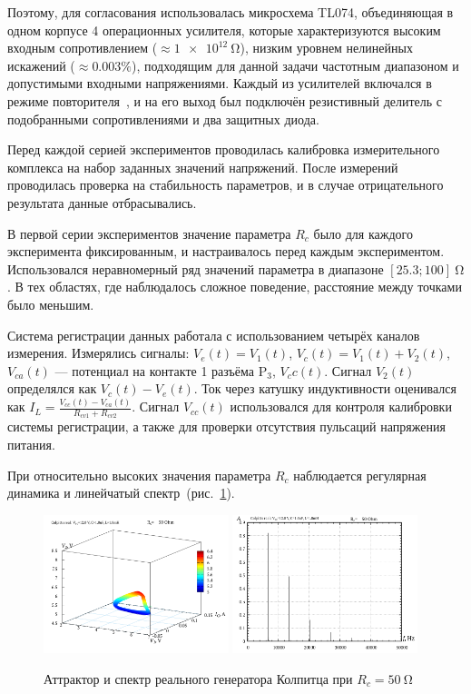 Поэтому, для согласования использовалась микросхема TL074,
объединяющая в одном корпусе 4 операционных усилителя,
которые характеризуются высоким входным сопротивлением ($\approx \SI{1e12}{\ohm}$),
низким уровнем нелинейных искажений ($\approx 0.003\%$),
подходящим для данной задачи частотным диапазоном
и допустимыми входными напряжениями.
Каждый из усилителей включался в режиме повторителя~\cite{horowitz},
и на его выход был подключён резистивный делитель
с подобранными сопротивлениями и два защитных диода.

Перед каждой серией экспериментов проводилась калибровка
измерительного комплекса на набор заданных значений напряжений.
После измерений проводилась проверка на стабильность
параметров, и в случае отрицательного результата
данные отбрасывались.

В первой серии экспериментов значение параметра
$R_c$ было для каждого эксперимента фиксированным,
и настраивалось перед каждым экспериментом.
Использовался неравномерный ряд значений параметра в диапазоне $[ 25.3 ; 100]\SI{}{\ohm} $.
В тех областях, где наблюдалось сложное поведение, расстояние между точками было меньшим.

Система регистрации данных работала с использованием четырёх
каналов измерения. Измерялись сигналы:
$V_e(t) = V_1(t)$,
$V_c(t) = V_1(t) + V_2(t)$,
$V_{ca}(t)$ --- потенциал на контакте 1 разъёма $\mathrm{P}_3$,
$V_cc(t)$.
Сигнал $V_2(t)$ определялся как $V_c(t) - V_e(t)$.
Ток через катушку индуктивности оценивался как
$I_L = \frac{V_{cc}(t) - V_{ca}(t)}{R_{cv1}+R_{cv2}}$.
Сигнал $V_{cc}(t)$ использовался для контроля калибровки
системы регистрации, а также для проверки отсутствия пульсаций напряжения питания.



При относительно высоких значения параметра $R_c$
наблюдается регулярная динамика и линейчатый спектр~(рис.~\ref{atu:f:colp_r_attr_f_50}).

\begin{figure}[htb!]
  \centerline{
    \includegraphics[width=0.48\textwidth]{p/r/v1iv2_050000.png}
    \hfill
    \includegraphics[width=0.48\textwidth]{p/r/f_050000.png}
  }
  \caption{Аттрактор и спектр реального генератора Колпитца при $R_c = \SI{50}{\ohm} $}
  \label{atu:f:colp_r_attr_f_50}
\end{figure}

